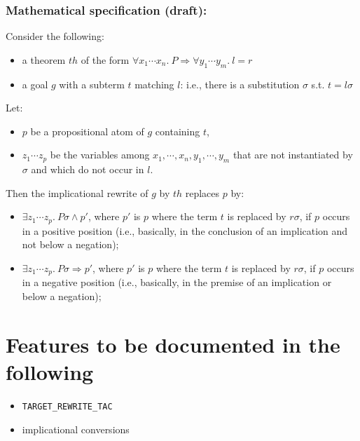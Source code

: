 \documentclass{llncs}
\begin{document}
		\subsubsection{Mathematical specification (draft):}
		Consider the following:
		\begin{itemize}
			\item a theorem $th$ of the form $\forall x_1\cdots x_n.\ P \Rightarrow \forall y_1\cdots y_m.\ l = r$
			\item a goal $g$ with a subterm $t$ matching $l$: i.e., there is a substitution $\sigma$ s.t. $t=l\sigma$
		\end{itemize}
		Let:
		\begin{itemize}
			\item $p$ be a propositional atom of $g$ containing $t$,
			\item $z_1\cdots z_p$ be the variables among $x_1,\cdots, x_n, y_1, \cdots, y_m$ that are not instantiated by $\sigma$ and which do not occur in $l$.
		\end{itemize}
		Then the implicational rewrite of $g$ by $th$ replaces $p$ by:
		\begin{itemize}
			\item $\exists z_1\cdots z_p.\ P\sigma \wedge p'$, where $p'$ is $p$ where the term $t$ is replaced by $r\sigma$,
				if $p$ occurs in a positive position (i.e., basically, in the conclusion of an implication and not below a negation);
			\item $\exists z_1\cdots z_p.\ P\sigma \Rightarrow p'$, where $p'$ is $p$ where the term $t$ is replaced by $r\sigma$,
				if $p$ occurs in a negative position (i.e., basically, in the premise of an implication or below a negation);
		\end{itemize}

	\section{Features to be documented in the following}

		\begin{itemize}
			\item \texttt{TARGET\_REWRITE\_TAC}
			\item implicational conversions
		\end{itemize}
\end{document}
